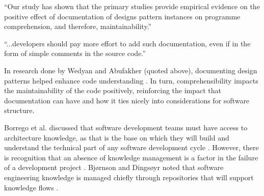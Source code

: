 \vspace{0.25cm}
\begin{displayquote}
  ``Our study has shown that the primary studies provide empirical evidence on the positive effect of documentation of designs pattern instances on programme comprehension, and therefore, maintainability.''
\end{displayquote}

\begin{displayquote}
  ``...developers should pay more effort to add such documentation, even if in the form of simple comments in the source code.''
\end{displayquote}
\vspace{0.25cm}

In research done by Wedyan and Abufakher (quoted above), documenting design patterns helped enhance code understanding \cite{wedyan:2020}. In turn, comprehensibility impacts the maintainability of the code positively, reinforcing the impact that documentation can have and how it ties nicely into considerations for software structure.

Borrego et al. discussed that software development teams must have access to architecture knowledge, as that is the base on which they will build and understand the technical part of any software development cycle \cite{borrego:2017}. However, there is recognition that an absence of knowledge management is a factor in the failure of a development project \cite{borrego:2017}. Bjørnson and Dingsøyr noted that software engineering knowledge is managed chiefly through repositories that will support knowledge flows \cite{bjornson:2008}.
